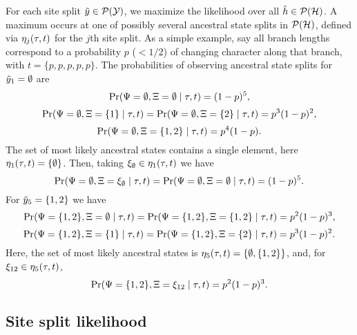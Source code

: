 For each site split $\tilde{y}\in\mathcal{P}(\mathcal{Y})$, we maximize the likelihood over all $\tilde{h}\in\mathcal{P}(\mathcal{H})$.
A maximum occurs at one of possibly several ancestral state splits in $\mathcal{P}(\mathcal{H})$, defined via $\eta_j(\tau, t)$ for the $j$th site split.
As a simple example, say all branch lengths correspond to a probability $p$ ($< 1/2$) of changing character along that branch, with $t=\{p,p,p,p,p\}$.
The probabilities of observing ancestral state splits for $\tilde{y}_1=\emptyset$ are
\[
\Pr(\Psi=\emptyset, \Xi=\emptyset \mid \tau, t) =
(1-p)^5,
\]
\[
\Pr(\Psi=\emptyset, \Xi=\{1\} \mid \tau, t) =
\Pr(\Psi=\emptyset, \Xi=\{2\} \mid \tau, t) =
p^3(1-p)^2,
\]
\[
\Pr(\Psi=\emptyset, \Xi=\{1,2\} \mid \tau, t) =
p^4(1-p).
\]
The set of most likely ancestral states contains a single element, here $\eta_1(\tau, t)=\{\emptyset\}$.
Then, taking $\xi_{\emptyset}\in\eta_1(\tau, t)$ we have
\[
\Pr(\Psi=\emptyset, \Xi=\xi_{\emptyset} \mid \tau, t) =
\Pr(\Psi=\emptyset, \Xi=\emptyset \mid \tau, t) =
(1-p)^5.
\]
For $\tilde{y}_5=\{1,2\}$ we have
\[
\Pr(\Psi=\{1,2\}, \Xi=\emptyset \mid \tau, t) =
\Pr(\Psi=\{1,2\}, \Xi=\{1,2\} \mid \tau, t) =
p^2(1-p)^3,
\]
\[
\Pr(\Psi=\{1,2\}, \Xi=\{1\} \mid \tau, t) =
\Pr(\Psi=\{1,2\}, \Xi=\{2\} \mid \tau, t) =
p^3(1-p)^2.
\]
Here, the set of most likely ancestral states is $\eta_5(\tau, t)=\{\emptyset,\{1,2\}\}$, and, for $\xi_{12}\in\eta_5(\tau, t)$,
\[
\Pr(\Psi=\{1,2\}, \Xi=\xi_{12} \mid \tau, t) =
p^2(1-p)^3.
\]

\subsection*{Site split likelihood}

